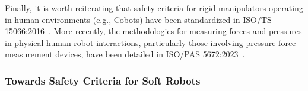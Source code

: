 Finally, it is worth reiterating that safety criteria for rigid manipulators operating in human environments (e.g., \glspl{Cobot}) have been standardized in ISO/TS 15066:2016~\citep{iso2016collaborative}. More recently, the methodologies for measuring forces and pressures in physical human-robot interactions, particularly those involving pressure-force measurement devices, have been detailed in ISO/PAS 5672:2023~\citep{iso2023measuring}.

\subsubsection{Towards Safety Criteria for Soft Robots}

